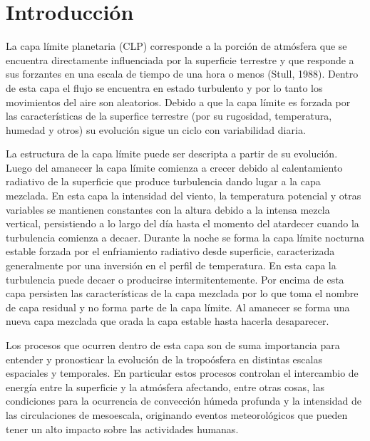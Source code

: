 \documentclass[12pt,spanish,oneside, a4paper]{book}
\begin{document}
\setcounter{tocdepth}{4} \tableofcontents

\listoffigures
\newpage

\listoftables
\newpage

\chapter{Introducción}\label{introduccion}

La capa límite planetaria (CLP) corresponde a la porción de atmósfera
que se encuentra directamente influenciada por la superficie terrestre y
que responde a sus forzantes en una escala de tiempo de una hora o menos
(Stull, 1988). Dentro de esta capa el flujo se encuentra en estado
turbulento y por lo tanto los movimientos del aire son aleatorios.
Debido a que la capa límite es forzada por las características de la
superfice terrestre (por su rugosidad, temperatura, humedad y otros) su
evolución sigue un ciclo con variabilidad diaria.

La estructura de la capa límite puede ser descripta a partir de su
evolución. Luego del amanecer la capa límite comienza a crecer debido al
calentamiento radiativo de la superficie que produce turbulencia dando
lugar a la capa mezclada. En esta capa la intensidad del viento, la
temperatura potencial y otras variables se mantienen constantes con la
altura debido a la intensa mezcla vertical, persistiendo a lo largo del
día hasta el momento del atardecer cuando la turbulencia comienza a
decaer. Durante la noche se forma la capa límite nocturna estable
forzada por el enfriamiento radiativo desde superficie, caracterizada
generalmente por una inversión en el perfil de temperatura. En esta capa
la turbulencia puede decaer o producirse intermitentemente. Por encima
de esta capa persisten las características de la capa mezclada por lo
que toma el nombre de capa residual y no forma parte de la capa límite.
Al amanecer se forma una nueva capa mezclada que orada la capa estable
hasta hacerla desaparecer.

Los procesos que ocurren dentro de esta capa son de suma importancia
para entender y pronosticar la evolución de la tropoósfera en distintas
escalas espaciales y temporales. En particular estos procesos controlan
el intercambio de energía entre la superficie y la atmósfera afectando,
entre otras cosas, las condiciones para la ocurrencia de convección
húmeda profunda y la intensidad de las circulaciones de mesoescala,
originando eventos meteorológicos que pueden tener un alto impacto sobre
las actividades humanas.
\end{document}
